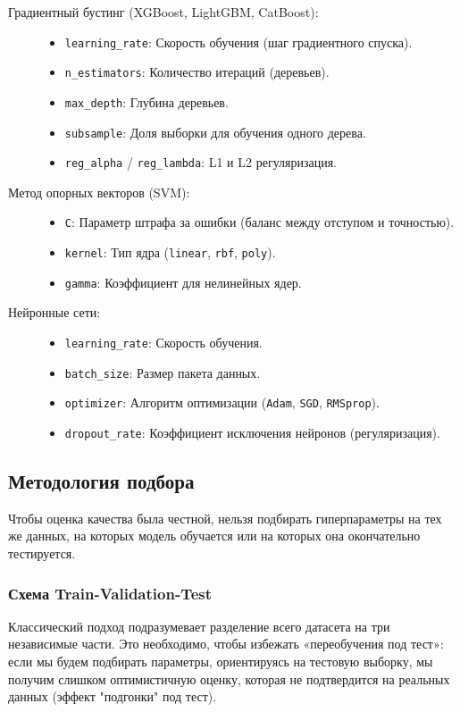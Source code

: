 \documentclass[12pt]{article}
\begin{document}
\begin{description}
    \item[Градиентный бустинг (XGBoost, LightGBM, CatBoost):]
    \begin{itemize}
        \item \texttt{learning\_rate}: Скорость обучения (шаг градиентного спуска).
        \item \texttt{n\_estimators}: Количество итераций (деревьев).
        \item \texttt{max\_depth}: Глубина деревьев.
        \item \texttt{subsample}: Доля выборки для обучения одного дерева.
        \item \texttt{reg\_alpha} / \texttt{reg\_lambda}: L1 и L2 регуляризация.
    \end{itemize}

    \item[Метод опорных векторов (SVM):]
    \begin{itemize}
        \item \texttt{C}: Параметр штрафа за ошибки (баланс между отступом и точностью).
        \item \texttt{kernel}: Тип ядра (\texttt{linear}, \texttt{rbf}, \texttt{poly}).
        \item \texttt{gamma}: Коэффициент для нелинейных ядер.
    \end{itemize}

    \item[Нейронные сети:]
    \begin{itemize}
        \item \texttt{learning\_rate}: Скорость обучения.
        \item \texttt{batch\_size}: Размер пакета данных.
        \item \texttt{optimizer}: Алгоритм оптимизации (\texttt{Adam}, \texttt{SGD}, \texttt{RMSprop}).
        \item \texttt{dropout\_rate}: Коэффициент исключения нейронов (регуляризация).
    \end{itemize}
\end{description}


\subsection{Методология подбора}
Чтобы оценка качества была честной, нельзя подбирать гиперпараметры на тех же данных, на которых модель обучается или на которых она окончательно тестируется.

\subsubsection{Схема Train-Validation-Test}
Классический подход подразумевает разделение всего датасета на три независимые части. Это необходимо, чтобы избежать «переобучения под тест»: если мы будем подбирать параметры, ориентируясь на тестовую выборку, мы получим слишком оптимистичную оценку, которая не подтвердится на реальных данных (эффект "подгонки" под тест).
\end{document}
